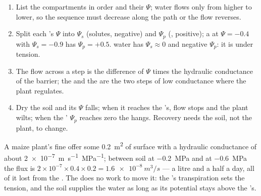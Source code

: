 \begin{method}\label{met:b1:plant-water-minerals:profile}
\begin{enumerate}
  \item List the compartments in order and their $\Psi$; water flows
        only from higher to lower, so the sequence must decrease along
        the path or the flow reverses.
  \item Split each 's $\Psi$ into $\Psi_s$ (solutes, negative) and
        $\Psi_p$ (, positive); a   at $\Psi = -0.4$ with
        $\Psi_s = -0.9$ has $\Psi_p = +0.5$.  water has
        $\Psi_s \approx 0$ and negative $\Psi_p$: it is under tension.
  \item The flow across a step is the difference of $\Psi$ times the
        hydraulic conductance of the barrier; the  and the
         are the two steps of low conductance where the plant
        regulates.
  \item Dry the soil and its $\Psi$ falls; when it reaches the 's,
        flow stops and the plant wilts; when the  ' $\Psi_p$
        reaches zero the  hangs. Recovery needs the soil, not the
        plant, to change.
\end{enumerate}
\end{method}

\begin{example}\label{ex:b1:plant-water-minerals:litre}
A maize plant's fine  offer some \qty{0.2}{m^2} of surface with a
hydraulic conductance of about \qty{2e-7}{m.s^{-1}.MPa^{-1}}; between
soil at \qty{-0.2}{MPa} and   at \qty{-0.6}{MPa} the flux is
$2\times 10^{-7}\times 0.4\times 0.2 = \qty{1.6e-8}{m^3/s}$ --- a
litre and a half a day, all of it lost from the . The  does
no work to move it: the 's transpiration sets the tension, and the
soil supplies the water as long as its potential stays above the
's.
\end{example}


